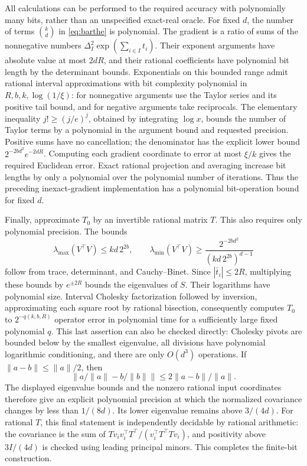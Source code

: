 All calculations can be performed to the required accuracy with polynomially many bits, rather than an unspecified exact-real oracle. For fixed $d$, the number of terms $\binom kd$ in \eqref{eq:barthe} is polynomial. The gradient is a ratio of sums of the nonnegative numbers $\Delta_I^2\exp(\sum_{i\in I}t_i)$. Their exponent arguments have absolute value at most $2dR$, and their rational coefficients have polynomial bit length by the determinant bounds. Exponentials on this bounded range admit rational interval approximations with bit complexity polynomial in $R,b,k,\log(1/\xi)$: for nonnegative arguments use the Taylor series and its positive tail bound, and for negative arguments take reciprocals. The elementary inequality $j!\ge(j/e)^j$, obtained by integrating $\log x$, bounds the number of Taylor terms by a polynomial in the argument bound and requested precision. Positive sums have no cancellation; the denominator has the explicit lower bound $2^{-2bd^2}e^{-2dR}$. Computing each gradient coordinate to error at most $\xi/k$ gives the required Euclidean error. Exact rational projection and averaging increase bit lengths by only a polynomial over the polynomial number of iterations. Thus the preceding inexact-gradient implementation has a polynomial bit-operation bound for fixed $d$.

Finally, approximate $T_0$ by an invertible rational matrix $T$. This also requires only polynomial precision. The bounds
\[
 \lambda_{\max}(V^\top V)\le kd\,2^{2b},\qquad
 \lambda_{\min}(V^\top V)\ge
 \frac{2^{-2bd^2}}{(kd\,2^{2b})^{d-1}}
\]
follow from trace, determinant, and Cauchy--Binet. Since $|\bar t_i|\le2R$, multiplying these bounds by $e^{\pm2R}$ bounds the eigenvalues of $S$. Their logarithms have polynomial size. Interval Cholesky factorization followed by inversion, approximating each square root by rational bisection, consequently computes $T_0$ to $2^{-q(k,b,R)}$ operator error in polynomial time for a sufficiently large fixed polynomial $q$. This last assertion can also be checked directly: Cholesky pivots are bounded below by the smallest eigenvalue, all divisions have polynomial logarithmic conditioning, and there are only $O(d^3)$ operations. If $\|a-b\|\le\|a\|/2$, then
\[
 \left\|a/\|a\|-b/\|b\|\right\|\le2\|a-b\|/\|a\|.
\]
The displayed eigenvalue bounds and the nonzero rational input coordinates therefore give an explicit polynomial precision at which the normalized covariance changes by less than $1/(8d)$. Its lower eigenvalue remains above $3/(4d)$. For rational $T$, this final statement is independently decidable by rational arithmetic: the covariance is the sum of $Tv_iv_i^\top T^\top/(v_i^\top T^\top Tv_i)$, and positivity above $3I/(4d)$ is checked using leading principal minors. This completes the finite-bit construction.

